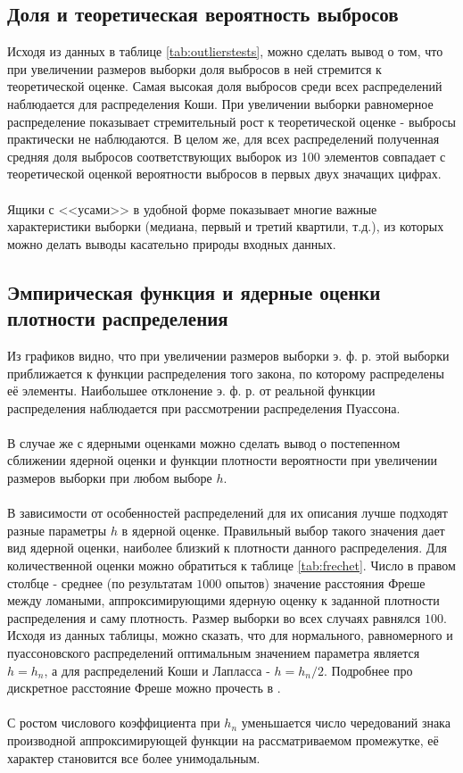 \documentclass[a4paper]{article}
\begin{document}
\subsection{Доля и теоретическая вероятность выбросов}
Исходя из данных в таблице \ref{tab:outlierstests}, можно сделать вывод о том, что при увеличении размеров выборки доля выбросов в ней стремится к теоретической оценке. Самая высокая доля выбросов среди всех распределений наблюдается для распределения Коши. При увеличении выборки равномерное распределение показывает стремительный рост к теоретической оценке - выбросы практически не наблюдаются. В целом же, для всех распределений полученная средняя доля выбросов соответствующих выборок из 100 элементов совпадает с теоретической оценкой вероятности выбросов в первых двух значащих цифрах.\\\\
Ящики с <<усами>> в удобной форме показывает многие важные характеристики выборки (медиана, первый и третий квартили, т.д.), из которых можно делать выводы касательно природы входных данных.
\subsection{Эмпирическая функция и ядерные оценки плотности распределения}
Из графиков видно, что при увеличении размеров выборки э. ф. р. этой выборки приближается к функции распределения того закона, по которому распределены её элементы. Наибольшее отклонение э. ф. р. от реальной функции распределения наблюдается при рассмотрении распределения Пуассона.\\\\
В случае же с ядерными оценками можно сделать вывод о постепенном сближении ядерной оценки и функции плотности вероятности при увеличении размеров выборки при любом выборе $h$.\\\\
В зависимости от особенностей распределений для их описания лучше подходят разные параметры $h$ в ядерной оценке. Правильный выбор такого значения дает вид ядерной оценки, наиболее близкий к плотности данного распределения. Для количественной оценки можно обратиться к таблице \ref{tab:frechet}. Число в правом столбце - среднее (по результатам $1000$ опытов) значение расстояния Фреше между ломаными, аппроксимирующими ядерную оценку к заданной плотности распределения и саму плотность. Размер выборки во всех случаях равнялся $100$. Исходя из данных таблицы, можно сказать, что для нормального, равномерного и пуассоновского распределений оптимальным значением параметра является $h=h_n$, а для распределений Коши и Лапласса - $h=h_n/2$. Подробнее про дискретное расстояние Фреше можно прочесть в \cite{book1}.\\\\
С ростом числового коэффициента при $h_n$ уменьшается число чередований знака производной аппроксимирующей функции на рассматриваемом промежутке, её характер становится все более унимодальным.
\end{document}
